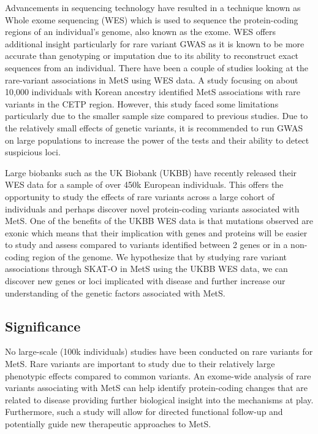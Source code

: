 \documentclass[11pt]{article}
\begin{document}
Advancements in sequencing technology have resulted in a technique known as Whole exome sequencing (WES) which is used to sequence the protein-coding regions of an individual's genome, also known as the exome. WES offers additional insight particularly for rare variant GWAS as it is known to be more accurate than genotyping or imputation due to its ability to reconstruct exact sequences from an individual. There have been a couple of studies looking at the rare-variant associations in MetS using WES data. A study focusing on about 10,000 individuals with Korean ancestry identified MetS associations with rare variants in the CETP region. However, this study faced some limitations particularly due to the smaller sample size compared to previous studies. Due to the relatively small effects of genetic variants, it is recommended to run GWAS on large populations to increase the power of the tests and their ability to detect suspicious loci.

Large biobanks such as the UK Biobank (UKBB) have recently released their WES data for a sample of over 450k European individuals. This offers the opportunity to study the effects of rare variants across a large cohort of individuals and perhaps discover novel protein-coding variants associated with MetS. One of the benefits of the UKBB WES data is that mutations observed are exonic which means that their implication with genes and proteins will be easier to study and assess compared to variants identified between 2 genes or in a non-coding region of the genome. We hypothesize that by studying rare variant associations through SKAT-O in MetS using the UKBB WES data, we can discover new genes or loci implicated with disease and further increase our understanding of the genetic factors associated with MetS.

\subsection*{Significance}

No large-scale (\>100k individuals) studies have been conducted on rare variants for MetS. Rare variants are important to study due to their relatively large phenotypic effects compared to common variants. An exome-wide analysis of rare variants associating with MetS can help identify protein-coding changes that are related to disease providing further biological insight into the mechanisms at play. Furthermore, such a study will allow for directed functional follow-up and potentially guide new therapeutic approaches to MetS.
\end{document}
